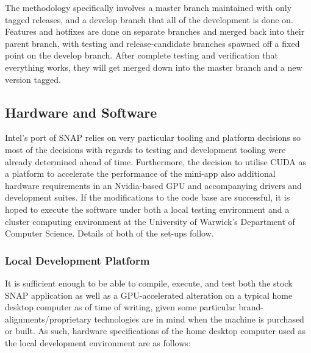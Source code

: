 \documentclass[conference]{IEEEtran}
\begin{document}
The methodology specifically involves a master branch maintained with only tagged releases, and a develop branch that all of the development is done on. Features and hotfixes are done on separate branches and merged back into their parent branch, with testing and release-candidate branches spawned off a fixed point on the develop branch. After complete testing and verification that everything works, they will get merged down into the master branch and a new version tagged.

\subsection{Hardware and Software}

Intel's port of SNAP relies on very particular tooling and platform decisions so most of the decisions with regards to testing and development tooling were already determined ahead of time. Furthermore, the decision to utilise CUDA as a platform to accelerate the performance of the mini-app also additional hardware requirements in an Nvidia-based GPU and accompanying drivers and development suites. If the modifications to the code base are successful, it is hoped to execute the software under both a local testing environment and a cluster computing environment at the University of Warwick's Department of Computer Science. Details of both of the set-ups follow.

\subsubsection{Local Development Platform}
\label{subsubsec:projmgmt_localtesting}

It is sufficient enough to be able to compile, execute, and test both the stock SNAP application as well as a GPU-accelerated alteration on a typical home desktop computer as of time of writing, given some particular brand-alignments/proprietary technologies are in mind when the machine is purchased or built. As such, hardware specifications of the home desktop computer used as the local development environment are as follows:
\end{document}
